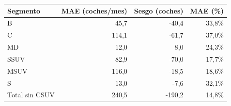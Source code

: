 \begin{tabular}{lrrr}
\toprule
Segmento & MAE (coches/mes) & Sesgo (coches) & MAE (\%) \\
\midrule
B & 45,7 & -40,4 & 33,8\% \\
C & 114,1 & -61,7 & 37,0\% \\
MD & 12,0 & 8,0 & 24,3\% \\
SSUV & 82,9 & -70,0 & 17,7\% \\
MSUV & 116,0 & -18,5 & 18,6\% \\
S & 13,0 & -7,6 & 32,1\% \\
Total sin CSUV & 240,5 & -190,2 & 14,8\% \\
\bottomrule
\end{tabular}
